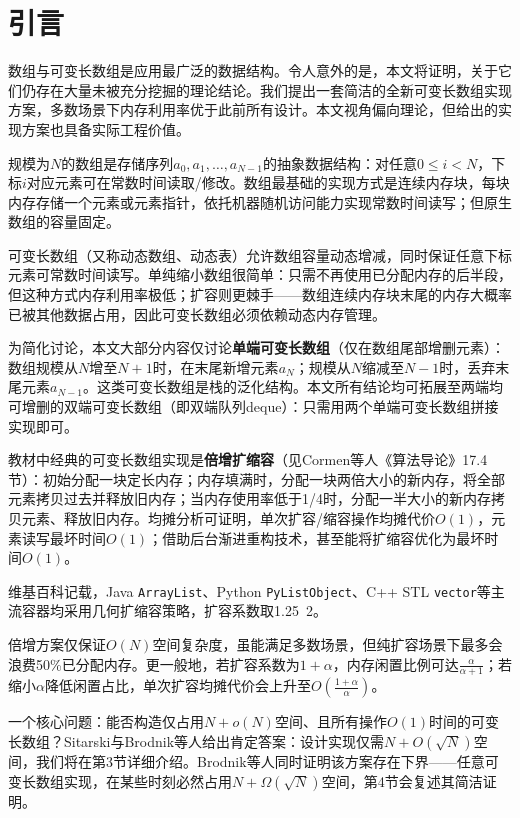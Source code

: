 \documentclass[11pt,a4paper]{article}
\begin{document}
\section{引言}
数组与可变长数组是应用最广泛的数据结构。令人意外的是，本文将证明，关于它们仍存在大量未被充分挖掘的理论结论。我们提出一套简洁的全新可变长数组实现方案，多数场景下内存利用率优于此前所有设计。本文视角偏向理论，但给出的实现方案也具备实际工程价值。

规模为$N$的数组是存储序列$a_0,a_1,\dots,a_{N-1}$的抽象数据结构：对任意$0\le i<N$，下标$i$对应元素可在常数时间读取/修改。数组最基础的实现方式是连续内存块，每块内存存储一个元素或元素指针，依托机器随机访问能力实现常数时间读写；但原生数组的容量固定。

可变长数组（又称动态数组、动态表）允许数组容量动态增减，同时保证任意下标元素可常数时间读写。单纯缩小数组很简单：只需不再使用已分配内存的后半段，但这种方式内存利用率极低；扩容则更棘手——数组连续内存块末尾的内存大概率已被其他数据占用，因此可变长数组必须依赖动态内存管理。

为简化讨论，本文大部分内容仅讨论\textbf{单端可变长数组}（仅在数组尾部增删元素）：数组规模从$N$增至$N+1$时，在末尾新增元素$a_N$；规模从$N$缩减至$N-1$时，丢弃末尾元素$a_{N-1}$。这类可变长数组是栈的泛化结构。本文所有结论均可拓展至两端均可增删的双端可变长数组（即双端队列deque）：只需用两个单端可变长数组拼接实现即可。

教材中经典的可变长数组实现是\textbf{倍增扩缩容}（见Cormen等人《算法导论》17.4节）：初始分配一块定长内存；内存填满时，分配一块两倍大小的新内存，将全部元素拷贝过去并释放旧内存；当内存使用率低于1/4时，分配一半大小的新内存拷贝元素、释放旧内存。均摊分析可证明，单次扩容/缩容操作均摊代价$O(1)$，元素读写最坏时间$O(1)$；借助后台渐进重构技术，甚至能将扩缩容优化为最坏时间$O(1)$。

维基百科记载，Java \texttt{ArrayList}、Python \texttt{PyListObject}、C++ STL \texttt{vector}等主流容器均采用几何扩缩容策略，扩容系数取1.25~2。

倍增方案仅保证$O(N)$空间复杂度，虽能满足多数场景，但纯扩容场景下最多会浪费50\%已分配内存。更一般地，若扩容系数为$1+\alpha$，内存闲置比例可达$\frac{\alpha}{\alpha+1}$；若缩小$\alpha$降低闲置占比，单次扩容均摊代价会上升至$O(\frac{1+\alpha}{\alpha})$。

一个核心问题：能否构造仅占用$N+o(N)$空间、且所有操作$O(1)$时间的可变长数组？Sitarski与Brodnik等人给出肯定答案：设计实现仅需$N+O(\sqrt{N})$空间，我们将在第3节详细介绍。Brodnik等人同时证明该方案存在下界——任意可变长数组实现，在某些时刻必然占用$N+\Omega(\sqrt{N})$空间，第4节会复述其简洁证明。
\end{document}
